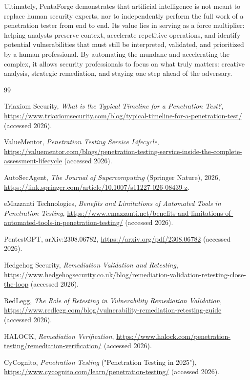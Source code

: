 \documentclass[12pt,a4paper]{report}
\begin{document}
Ultimately, PentaForge demonstrates that artificial intelligence is not meant to replace 
human security experts, nor to independently perform the full work of a penetration 
tester from end to end. Its value lies in serving as a force multiplier: helping 
analysts preserve context, accelerate repetitive operations, and identify potential 
vulnerabilities that must still be interpreted, validated, and prioritized by a human 
professional. By automating the mundane and accelerating the complex, it allows security 
professionals to focus on what truly matters: creative analysis, strategic remediation, 
and staying one step ahead of the adversary.

\cleardoublepage
{}
\begin{thebibliography}{99}

Triaxiom Security, \textit{What is the Typical Timeline for a Penetration Test?}, \url{https://www.triaxiomsecurity.com/blog/typical-timeline-for-a-penetration-test/} (accessed 2026).

ValueMentor, \textit{Penetration Testing Service Lifecycle}, \url{https://valuementor.com/blogs/penetration-testing-service-inside-the-complete-assessment-lifecycle} (accessed 2026).

AutoSecAgent, \textit{The Journal of Supercomputing} (Springer Nature), 2026, \url{https://link.springer.com/article/10.1007/s11227-026-08439-z}.

eMazzanti Technologies, \textit{Benefits and Limitations of Automated Tools in Penetration Testing}, \url{https://www.emazzanti.net/benefits-and-limitations-of-automated-tools-in-penetration-testing/} (accessed 2026).

PentestGPT, arXiv:2308.06782, \url{https://arxiv.org/pdf/2308.06782} (accessed 2026).

Hedgehog Security, \textit{Remediation Validation and Retesting}, \url{https://www.hedgehogsecurity.co.uk/blog/remediation-validation-retesting-close-the-loop} (accessed 2026).

RedLegg, \textit{The Role of Retesting in Vulnerability Remediation Validation}, \url{https://www.redlegg.com/blog/vulnerability-remediation-retesting-guide} (accessed 2026).

HALOCK, \textit{Remediation Verification}, \url{https://www.halock.com/penetration-testing/remediation-verification/} (accessed 2026).

CyCognito, \textit{Penetration Testing} ("Penetration Testing in 2025"), \url{https://www.cycognito.com/learn/penetration-testing/} (accessed 2026).

\end{thebibliography}
\end{document}
